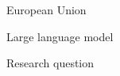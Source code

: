 
\begin{description}[labelwidth=5em, leftmargin=6em, labelindent=0pt]
  \item[EU] European Union
  \item[LLM] Large language model
  \item[RQ] Research question
\end{description}

